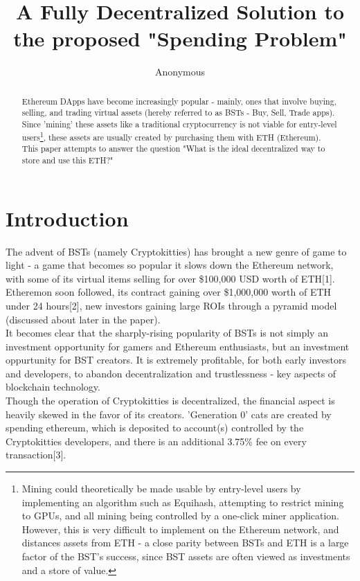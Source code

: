 \documentclass{article}
\title{A Fully Decentralized Solution to the proposed "Spending Problem"}
\author{Anonymous}
\date
\begin{document}
\maketitle


\begin{abstract}
Ethereum DApps have become increasingly popular - mainly, ones that involve buying, selling, and trading virtual assets (hereby referred to as BSTs - Buy, Sell, Trade apps). Since 'mining' these assets like a traditional cryptocurrency is not viable for entry-level users\footnote{Mining could theoretically be made usable by entry-level users by implementing an algorithm such as Equihash, attempting to restrict mining to GPUs, and all mining being controlled by a one-click miner application. However, this is very difficult to implement on the Ethereum network, and distances assets from ETH - a close parity between BSTs and ETH is a large factor of the BST's success, since BST assets are often viewed as investments and a store of value.}, these assets are usually created by purchasing them with ETH (Ethereum). This paper attempts to answer the question "What is the ideal decentralized way to store and use this ETH?"
\end{abstract}

\section{Introduction}
The advent of BSTs (namely Cryptokitties) has brought a new genre of game to light - a game that becomes so popular it slows down the Ethereum network, with some of its virtual items selling for over \$100,000 USD worth of ETH[1]. Etheremon soon followed, its contract gaining over \$1,000,000 worth of ETH under 24 hours[2], new investors gaining large ROIs through a pyramid model (discussed about later in the paper).
\\

It becomes clear that the sharply-rising popularity of BSTs is not simply an investment opportunity for gamers and Ethereum enthusiasts, but an investment oppurtunity for BST creators. It is extremely profitable, for both early investors and developers, to abandon decentralization and trustlessness - key aspects of blockchain technology.
\\

Though the operation of Cryptokitties is decentralized, the financial aspect is heavily skewed in the favor of its creators. 'Generation 0' cats are created by spending ethereum, which is deposited to account(s) controlled by the Cryptokitties developers, and there is an additional 3.75\% fee on every transaction[3].
\\
\end{document}
